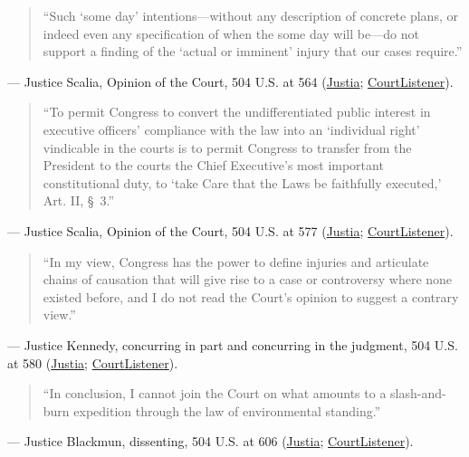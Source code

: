 \documentclass[12pt]{article}
\begin{document}
\begin{quote}
``Such `some day' intentions---without any description of concrete plans, or indeed even any specification of when the some day will be---do not support a finding of the `actual or imminent' injury that our cases require.''
\end{quote}
\noindent --- Justice Scalia, Opinion of the Court, 504 U.S. at 564 (\href{https://supreme.justia.com/cases/federal/us/504/555/}{Justia}; \href{https://www.courtlistener.com/opinion/112747/lujan-v-defenders-of-wildlife/}{CourtListener}).

\begin{quote}
``To permit Congress to convert the undifferentiated public interest in executive officers' compliance with the law into an `individual right' vindicable in the courts is to permit Congress to transfer from the President to the courts the Chief Executive's most important constitutional duty, to `take Care that the Laws be faithfully executed,' Art. II, \S~3.''
\end{quote}
\noindent --- Justice Scalia, Opinion of the Court, 504 U.S. at 577 (\href{https://supreme.justia.com/cases/federal/us/504/555/}{Justia}; \href{https://www.courtlistener.com/opinion/112747/lujan-v-defenders-of-wildlife/}{CourtListener}).

\begin{quote}
``In my view, Congress has the power to define injuries and articulate chains of causation that will give rise to a case or controversy where none existed before, and I do not read the Court's opinion to suggest a contrary view.''
\end{quote}
\noindent --- Justice Kennedy, concurring in part and concurring in the judgment, 504 U.S. at 580 (\href{https://supreme.justia.com/cases/federal/us/504/555/}{Justia}; \href{https://www.courtlistener.com/opinion/112747/lujan-v-defenders-of-wildlife/}{CourtListener}).

\begin{quote}
``In conclusion, I cannot join the Court on what amounts to a slash-and-burn expedition through the law of environmental standing.''
\end{quote}
\noindent --- Justice Blackmun, dissenting, 504 U.S. at 606 (\href{https://supreme.justia.com/cases/federal/us/504/555/}{Justia}; \href{https://www.courtlistener.com/opinion/112747/lujan-v-defenders-of-wildlife/}{CourtListener}).
\end{document}

